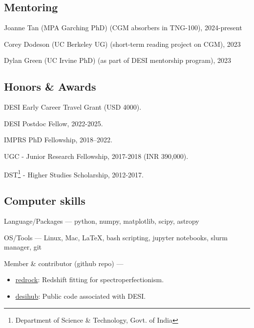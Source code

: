 \documentclass[12pt,letterpaper]{article}
\begin{document}
\subsection{Mentoring}
\begin{list}{}{\cvlist}
\item Joanne Tan (MPA Garching PhD) (CGM absorbers in TNG-100), 2024-present
\item Corey Dodeson (UC Berkeley UG) (short-term reading project on CGM), 2023
\item Dylan Green (UC Irvine PhD) (as part of DESI mentorship program), 2023
\end{list}

\subsection{Honors \& Awards}
\begin{list}{}{\cvlist}
  \item DESI Early Career Travel Grant (USD 4000).
  \item DESI Postdoc Fellow, 2022-2025.
  \item IMPRS PhD Fellowship, 2018--2022.
  \item UGC - Junior Research Fellowship, 2017-2018 (INR 390,000).
  \item DST\footnote{Department of Science \& Technology, Govt. of India} - Higher Studies Scholarship, 2012-2017.

\end{list}

\subsection{Computer skills}
\begin{list}{}{\cvlist}
\item Language/Packages ---  
    python, numpy, matplotlib, scipy, astropy
\item OS/Tools --- Linux, Mac, \LaTeX, bash scripting, jupyter notebooks, slurm manager, git
\item Member \& contributor (github repo) ---
    \begin{itemize}
      \item[] \href{https://github.com/desihub/redrock}{redrock}: Redshift      fitting for spectroperfectionism.
      \item[] \href{https://github.com/desihub}{desihub}: Public code           associated with DESI.
    \end{itemize}
\end{list}
\end{document}
